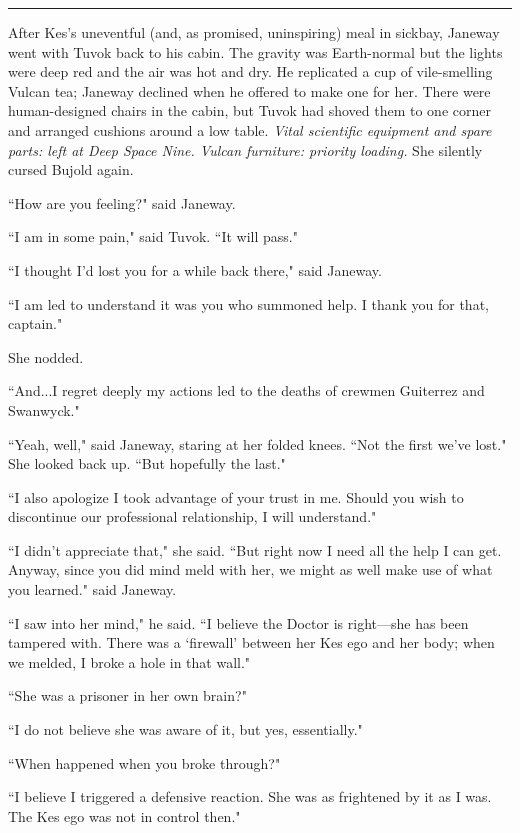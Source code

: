 \documentclass[twoside,letterpaper,12pt]{memoir}
\begin{document}
\begin{center}\rule{3cm}{0.4 pt}\end{center} 

After Kes's uneventful (and, as promised, uninspiring) meal in sickbay, Janeway went with Tuvok back to his cabin. The gravity was Earth-normal but the lights were deep red and the air was hot and dry. He replicated a cup of vile-smelling Vulcan tea; Janeway declined when he offered to make one for her. There were human-designed chairs in the cabin, but Tuvok had shoved them to one corner and arranged cushions around a low table. \textit{Vital scientific equipment and spare parts: left at Deep Space Nine. Vulcan furniture: priority loading. }She silently cursed Bujold again. 

``How are you feeling?" said Janeway. 

``I am in some pain," said Tuvok. ``It will pass." 

``I thought I'd lost you for a while back there," said Janeway. 

``I am led to understand it was you who summoned help. I thank you for that, captain." 

She nodded. 

``And...I regret deeply my actions led to the deaths of crewmen Guiterrez and Swanwyck." 

``Yeah, well," said Janeway, staring at her folded knees. ``Not the first we've lost." She looked back up. ``But hopefully the last." 

``I also apologize I took advantage of your trust in me. Should you wish to discontinue our professional relationship, I will understand." 

``I didn't appreciate that," she said. ``But right now I need all the help I can get. Anyway, since you did mind meld with her, we might as well make use of what you learned." said Janeway. 

``I saw into her mind," he said. ``I believe the Doctor is right---she has been tampered with. There was a `firewall' between her Kes ego and her body; when we melded, I broke a hole in that wall." 

``She was a prisoner in her own brain?" 

``I do not believe she was aware of it, but yes, essentially." 

``When happened when you broke through?" 

``I believe I triggered a defensive reaction. She was as frightened by it as I was. The Kes ego was not in control then." 
\end{document}
